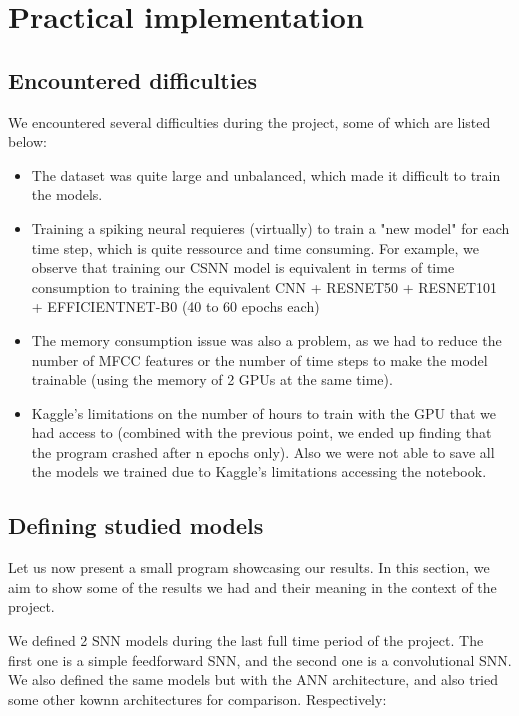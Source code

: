\documentclass[11pt]{article}
\begin{document}
\cite{eshraghian2021training}


\section{Practical implementation}

\subsection{Encountered difficulties}

We encountered several difficulties during the project, some of which are listed below:

\begin{itemize}
  \item The dataset was quite large and unbalanced, which made it difficult to train the models. 
  \item Training a spiking neural requieres (virtually) to train a "new model" for each time step, which is quite ressource and time consuming. 
  For example, we observe that training our CSNN model is equivalent in terms of time consumption to training the equivalent CNN + RESNET50 + RESNET101 + EFFICIENTNET-B0 (40 to 60 epochs each)
  \item The memory consumption issue was also a problem, as we had to reduce the number of MFCC features or the number of time steps to make the model trainable (using the memory of 2 GPUs at the same time).
  \item Kaggle's limitations on the number of hours to train with the GPU that we had access to (combined with the previous point, we ended up finding that the program crashed after n epochs only). Also we were not able to save all the models we trained due to Kaggle's limitations accessing the notebook. 
\end{itemize}

\subsection{Defining studied models}

Let us now present a small program showcasing our results.
In this section, we aim to show some of the results we had and their meaning in the context of the project.

We defined 2 SNN models during the last full time period of the project. The first one is a simple feedforward SNN, and the second one is a convolutional SNN. We also defined the same models but with the ANN architecture, and also tried some other kownn architectures for comparison. Respectively:
\end{document}
